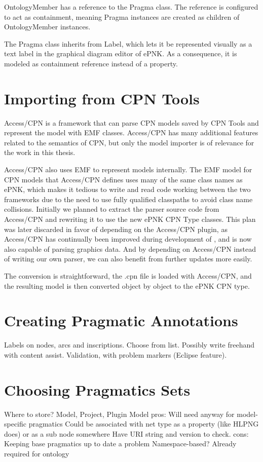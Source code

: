 OntologyMember has a reference to the Pragma class. The reference is
configured to act as containment, meaning Pragma instances are created as
children of OntologyMember instances.

The Pragma class inherits from Label, which lets it be represented visually as a
text label in the graphical diagram editor of ePNK. As a consequence, it is
modeled as containment reference instead of a property. 

\section{Importing from CPN Tools}
Access/CPN is a framework that can parse CPN models saved by CPN Tools and
represent the model with EMF classes. Access/CPN has many additional features
related to the semantics of CPN, but only the model importer is of relevance for
the work in this thesis.

Access/CPN also uses EMF to represent models internally. The EMF model for CPN
models that Access/CPN defines uses many of the same class names as ePNK, which
makes it tedious to write and read code working between the two frameworks due
to the need to use fully qualified classpaths to avoid class name collisions.
Initially we planned to extract the parser source code from Access/CPN and
rewriting it to use the new ePNK CPN Type classes. This plan was later discarded
in favor of depending on the Access/CPN plugin, as Access/CPN has continually
been improved during development of \thename{}, and is now also capable of
parsing graphics data. And by depending on Access/CPN instead of writing our own
parser, we can also benefit from further updates more easily.

The conversion is straightforward, the .cpn file is loaded with Access/CPN,
and the resulting model is then converted object by object to the ePNK CPN type.

\section{Creating Pragmatic Annotations}
Labels on nodes, arcs and inscriptions. 
Choose from list. Possibly write freehand with content assist. Validation, with
problem markers (Eclipse feature).

\section{Choosing Pragmatics Sets}
Where to store? Model, Project, Plugin
Model pros:
	Will need anyway for model-specific pragmatics
	Could be associated with net type as a property (like HLPNG does) or as a sub
	node somewhere
	Have URI string and version to check.
cons:
	Keeping base pragmatics up to date a problem
Namespace-based? Already required for ontology


